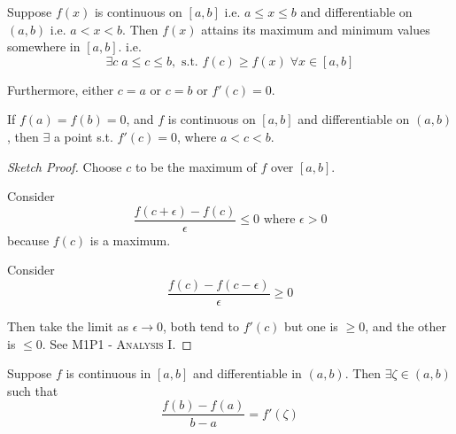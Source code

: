 \documentclass[twoside]{scrartcl}
\begin{document}

\begin{theorem}
Suppose  $f(x)$ is continuous on $[a,b]$ i.e. $a \leq x \leq b$ and differentiable on $(a,b)$ i.e. $a < x < b$. Then $f(x)$ attains its maximum and minimum values somewhere in $[a,b]$. i.e. 
\[\exists c \; a\leq c \leq b, \text{ s.t. } f(c) \geq f(x)\; \forall x \in [a,b]\]

Furthermore, either $c = a$ or $c = b$ or $f'(c) = 0$. 
\end{theorem}


\begin{theorem}
	If $f(a) = f(b) = 0$, and $f$ is continuous on $[a,b]$ and differentiable on $(a,b)$, then $\exists$ a point s.t. $f'(c) = 0$, where $a < c < b$. 
\end{theorem}

\begin{proof}[Sketch Proof]

Choose $c$ to be the maximum of $f$ over $[a,b]$. 

Consider 
\[\frac{f(c + \epsilon) - f(c)}{\epsilon} \leq 0 \text{ where } \epsilon > 0\]
because $f(c)$ is a maximum. 

Consider 
\[\frac{f(c) - f(c-\epsilon)}{\epsilon} \geq 0\]

Then take the limit as $\epsilon \to 0$, both tend to $f'(c)$ but one is $\geq 0$, and the other is $\leq 0$. See \textsc{M1P1 - Analysis I}. 
\end{proof}\vspace*{5pt}


\begin{theorem}
Suppose $f$ is continuous in $[a,b]$ and differentiable in $(a,b)$. Then $\exists \zeta \in (a,b)$ such that 
\[\frac{f(b) - f(a)}{b-a} = f'(\zeta)\]
\end{theorem}


\begin{center}
\end{center}
\end{document}
